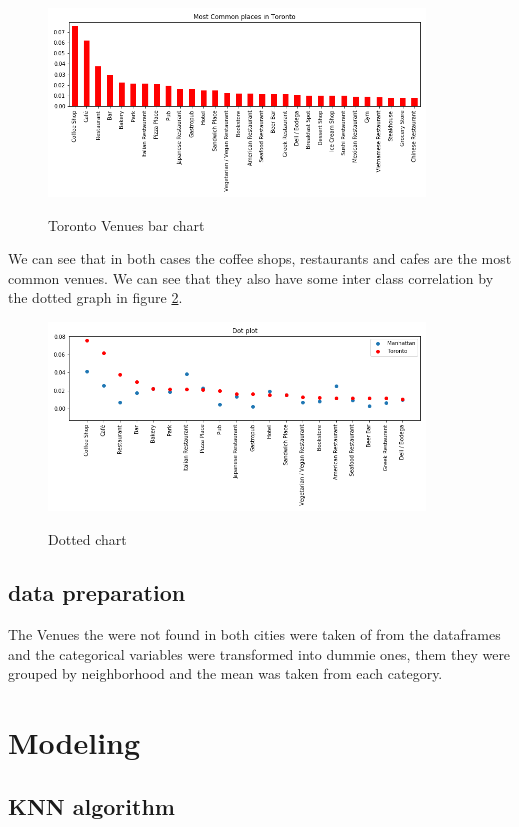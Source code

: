 \documentclass{article}
\begin{document}
\begin{figure}[h!]
	\includegraphics[width=10cm]{Common_toronto.png}
	\label{commom_tor}
	\caption{Toronto Venues bar chart}
\end{figure}

We can see that in both cases the coffee shops, restaurants and cafes are the most common venues. We can see that they also have some inter class correlation by the dotted graph in figure \ref{dotted}.

\begin{figure}[h!]
	\includegraphics[width=10cm]{dotted_toronto.png}
	\label{dotted}
	\caption{Dotted chart}
\end{figure}

\subsection{data preparation}
The Venues the were not found in both cities were taken of from the dataframes and the categorical variables were transformed into dummie ones, them they were grouped by neighborhood and the mean  was taken from each category.

\section{Modeling}
\subsection{KNN algorithm}
\end{document}
